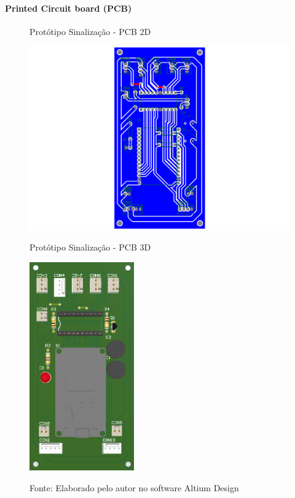 \documentclass[../delivery_hospital_report.tex]{subfiles}
\begin{document}
\paragraph{Printed Circuit board (PCB)}

\begin{figure}[!ht]
    \centering
    \begin{minipage}{0.5\textwidth}
        \centering
        \caption{Protótipo Sinalização - PCB 2D}
        \includegraphics[width=1.03\textwidth]{modulos/Sinalização-2.png} 
        \label{fig:figura1minipg}
    \end{minipage}\hfill
    \begin{minipage}{0.5\textwidth}
        \centering
        \caption{Protótipo Sinalização - PCB 3D }
        \includegraphics[width=0.4\textwidth]{modulos/Sinalização.png} 
        \label{fig:figura1minipg}
    \end{minipage}\hfill
    
    \caption*{Fonte: Elaborado pelo autor no software Altium Design\cite{altium21} }
    \label{fig:figurasminipg}
\end{figure}
\end{document}
